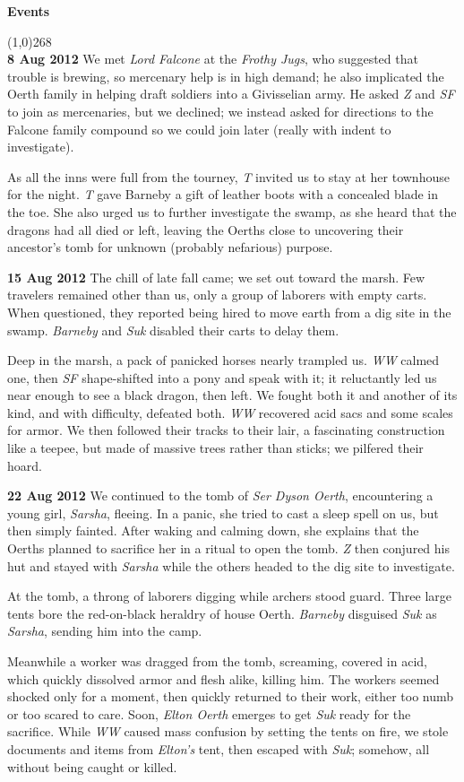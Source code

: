 \documentclass[letterpaper]{article}
\newcommand{\colline}{\line(1,0){268} \\}
\newcommand{\e}[1]{\emph{#1}}
\newcommand{\B}[1]{\textbf{#1}}
\newenvironment{notesection}[1]
{ {\huge \B{#1}} \par
\vspace{-0.75em}
\colline
\begingroup\fontsize{9pt}{12pt}\selectfont}
{\endgroup}
\begin{document}
\begin{notesection}{Events}
\B{8 Aug 2012} We met \e{Lord Falcone} at the \e{Frothy Jugs}, who suggested that trouble is brewing, so mercenary help is in high demand; he also implicated the Oerth family in helping draft soldiers into a Givisselian army.  He asked \e{Z} and \e{SF} to join as mercenaries, but we declined; we instead asked for directions to the Falcone family compound so we could join later (really with indent to investigate).

As all the inns were full from the tourney, \e{T} invited us to stay at her townhouse for the night. \e{T} gave Barneby a gift of leather boots with a concealed blade in the toe. She also urged us to further investigate the swamp, as she heard that the dragons had all died or left, leaving the Oerths close to uncovering their ancestor's tomb for unknown (probably nefarious) purpose.

\B{15 Aug 2012} The chill of late fall came; we set out toward the marsh. Few travelers remained other than us, only a group of laborers with empty carts. When questioned, they reported being hired to move earth from a dig site in the swamp.  \e{Barneby} and \e{Suk} disabled their carts to delay them.

Deep in the marsh, a pack of panicked horses nearly trampled us.  \e{WW} calmed one, then \e{SF} shape-shifted into a pony and speak with it; it reluctantly led us near enough to see a black dragon, then left. We fought both it and another of its kind, and with difficulty, defeated both. \e{WW} recovered acid sacs and some scales for armor. We then followed their tracks to their lair, a fascinating construction like a teepee, but made of massive trees rather than sticks; we pilfered their hoard.

\B{22 Aug 2012} We continued to the tomb of \e{Ser Dyson Oerth}, encountering a young girl, \e{Sarsha}, fleeing. In a panic, she tried to cast a sleep spell on us, but then simply fainted. After waking and calming down, she explains that the Oerths planned to sacrifice her in a ritual to open the tomb. \e{Z} then conjured his hut and stayed with \e{Sarsha} while the others headed to the dig site to investigate.

At the tomb, a throng of laborers digging while archers stood guard. Three large tents bore the red-on-black heraldry of house Oerth. \e{Barneby} disguised \e{Suk} as \e{Sarsha}, sending him into the camp.

Meanwhile a worker was dragged from the tomb, screaming, covered in acid, which quickly dissolved armor and flesh alike, killing him. The workers seemed shocked only for a moment, then quickly returned to their work, either too numb or too scared to care. Soon, \e{Elton Oerth} emerges to get \e{Suk} ready for the sacrifice. While \e{WW} caused mass confusion by setting the tents on fire, we stole documents and items from \e{Elton's} tent, then escaped with \e{Suk}; somehow, all without being caught or killed.


\end{notesection}
\end{document}
